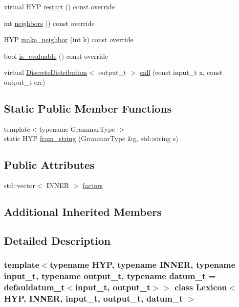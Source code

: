 \begin{DoxyCompactItemize}
\item 
virtual H\+YP \hyperlink{class_lexicon_ac8577ba9b4554ebf1852020c617bd7df}{restart} () const override
\item 
int \hyperlink{class_lexicon_a6419f323377d4c524363707eee0cae09}{neighbors} () const override
\item 
H\+YP \hyperlink{class_lexicon_a88a02f88387f436c6ff4c060735291ea}{make\+\_\+neighbor} (int k) const override
\item 
bool \hyperlink{class_lexicon_ab9fcefbd8598a5401a39bd59e8043db9}{is\+\_\+evaluable} () const override
\item 
virtual \hyperlink{class_discrete_distribution}{Discrete\+Distribution}$<$ output\+\_\+t $>$ \hyperlink{class_lexicon_afc6b762f68c6033a501ce7ca04b01ece}{call} (const input\+\_\+t x, const output\+\_\+t err)
\end{DoxyCompactItemize}
\subsection*{Static Public Member Functions}
\begin{DoxyCompactItemize}
\item 
{\footnotesize template$<$typename Grammar\+Type $>$ }\\static H\+YP \hyperlink{class_lexicon_a9c9fd97a05a82e4f8b202850f8e8802c}{from\+\_\+string} (Grammar\+Type \&g, std\+::string s)
\end{DoxyCompactItemize}
\subsection*{Public Attributes}
\begin{DoxyCompactItemize}
\item 
std\+::vector$<$ I\+N\+N\+ER $>$ \hyperlink{class_lexicon_ac70865eb23b1e23f53f21e1760adac00}{factors}
\end{DoxyCompactItemize}
\subsection*{Additional Inherited Members}


\subsection{Detailed Description}
\subsubsection*{template$<$typename H\+YP, typename I\+N\+N\+ER, typename input\+\_\+t, typename output\+\_\+t, typename datum\+\_\+t = defauldatum\+\_\+t$<$input\+\_\+t, output\+\_\+t$>$$>$\newline
class Lexicon$<$ H\+Y\+P, I\+N\+N\+E\+R, input\+\_\+t, output\+\_\+t, datum\+\_\+t $>$}

